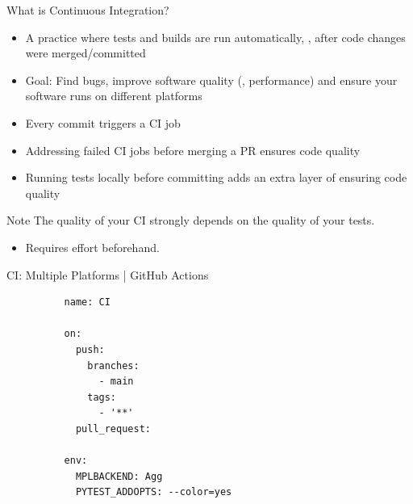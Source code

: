 \secslide[\fontsize{1cm}{1cm}\selectfont]{Continuous Integration (CI),\\ Deployment,\\ and Continuous Delivery (CD)}

\begin{frame}[fragile]{What is Continuous Integration?}
  \begin{itemize}
    \setlength{\itemsep}{1em}
    \item A practice where tests and builds are run automatically, \eg, after code changes were
      merged/committed
    \item Goal: Find bugs, improve software quality (\eg, performance) and ensure
      your software runs on different platforms
    \item Every commit triggers a CI job
    \item Addressing failed CI jobs before merging a PR ensures code quality
    \item Running tests locally before committing adds an extra layer of ensuring code quality
  \end{itemize}
  \begin{block}{Note}
     The quality of your CI strongly depends on the quality of your tests.
     \begin{itemize}
      \item [\to] Requires effort beforehand.
     \end{itemize}
  \end{block}
\end{frame}


\begin{darkframe}[fragile]{CI: Multiple Platforms | GitHub Actions}
  \begin{enumerate}
        \begin{verbatim}
          name: CI

          on:
            push:
              branches:
                - main
              tags:
                - '**'
            pull_request:

          env:
            MPLBACKEND: Agg
            PYTEST_ADDOPTS: --color=yes
        \end{verbatim}
  \end{enumerate}
\end{darkframe}


